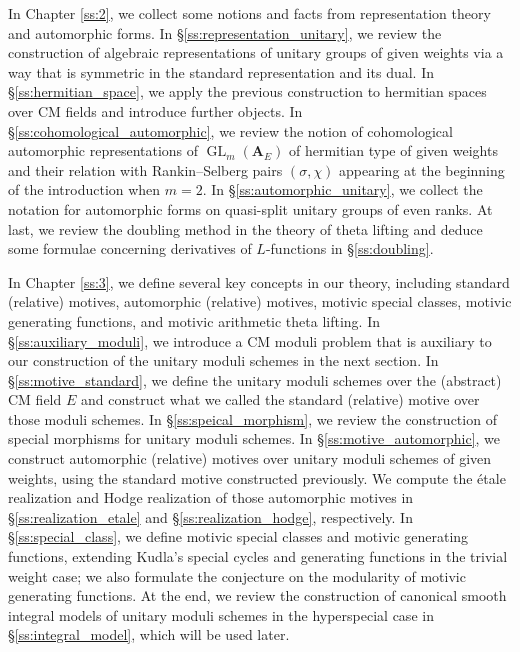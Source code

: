 \documentclass[12pt]{amsart}
\numberwithin{equation}{section}
\theoremstyle{plain}
\theoremstyle{definition}
\theoremstyle{remark}
\renewcommand{\b}[1]{\mathbf{#1}}
\renewcommand{\(}{\left(}
\renewcommand{\)}{\right)}
\newcommand{\bA}{\b A}
\DeclareMathOperator{\GL}{GL}
\begin{document}
In Chapter \ref{ss:2}, we collect some notions and facts from representation theory and automorphic forms. In \S\ref{ss:representation_unitary}, we review the construction of algebraic representations of unitary groups of given weights via a way that is symmetric in the standard representation and its dual. In \S\ref{ss:hermitian_space}, we apply the previous construction to hermitian spaces over CM fields and introduce further objects. In \S\ref{ss:cohomological_automorphic}, we review the notion of cohomological automorphic representations of $\GL_m(\bA_E)$ of hermitian type of given weights and their relation with Rankin--Selberg pairs $(\sigma,\chi)$ appearing at the beginning of the introduction when $m=2$. In \S\ref{ss:automorphic_unitary}, we collect the notation for automorphic forms on quasi-split unitary groups of even ranks. At last, we review the doubling method in the theory of theta lifting and deduce some formulae concerning derivatives of $L$-functions in \S\ref{ss:doubling}.


In Chapter \ref{ss:3}, we define several key concepts in our theory, including standard (relative) motives, automorphic (relative) motives, motivic special classes, motivic generating functions, and motivic arithmetic theta lifting. In \S\ref{ss:auxiliary_moduli}, we introduce a CM moduli problem that is auxiliary to our construction of the unitary moduli schemes in the next section. In \S\ref{ss:motive_standard}, we define the unitary moduli schemes over the (abstract) CM field $E$ and construct what we called the standard (relative) motive over those moduli schemes. In \S\ref{ss:speical_morphism}, we review the construction of special morphisms for unitary moduli schemes. In \S\ref{ss:motive_automorphic}, we construct automorphic (relative) motives over unitary moduli schemes of given weights, using the standard motive constructed previously. We compute the \'{e}tale realization and Hodge realization of those automorphic motives in \S\ref{ss:realization_etale} and \S\ref{ss:realization_hodge}, respectively. In \S\ref{ss:special_class}, we define motivic special classes and motivic generating functions, extending Kudla's special cycles and generating functions in the trivial weight case; we also formulate the conjecture on the modularity of motivic generating functions. At the end, we review the construction of canonical smooth integral models of unitary moduli schemes in the hyperspecial case in \S\ref{ss:integral_model}, which will be used later.
\end{document}
